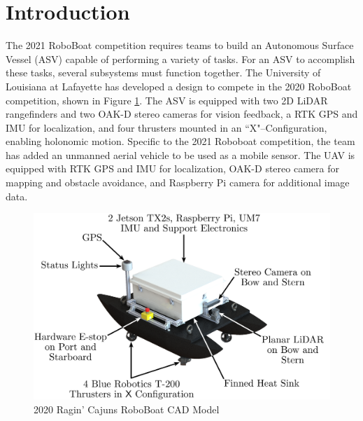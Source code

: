 \documentclass[letterpaper, 12 pt, conference]{ieeeconf}
\begin{document}
\section{Introduction}
The 2021 RoboBoat competition requires teams to build an Autonomous Surface Vessel (ASV) capable of performing a variety of tasks. For an ASV to accomplish these tasks, several subsystems must function together. The University of Louisiana at Lafayette has developed a design to compete in the 2020 RoboBoat competition, shown in Figure \ref{fig:RoboBoat}. The ASV is equipped with two 2D LiDAR rangefinders and two OAK-D stereo cameras for vision feedback, a RTK GPS and IMU for localization, and four thrusters mounted in an ``X"--Configuration, enabling holonomic motion. Specific to the 2021 Roboboat competition, the team has added an unmanned aerial vehicle to be used as a mobile sensor. The UAV is equipped with RTK GPS and IMU for localization, OAK-D stereo camera for mapping and obstacle avoidance, and Raspberry Pi camera for additional image data. 
%
\begin{figure}[tb]
\centering
\includegraphics[width=\columnwidth]{Figures/Catamaran_Final_Render_3.pdf}
\caption{2020 Ragin' Cajuns RoboBoat CAD Model}
\label{fig:RoboBoat}
\end{figure}
%
\end{document}
